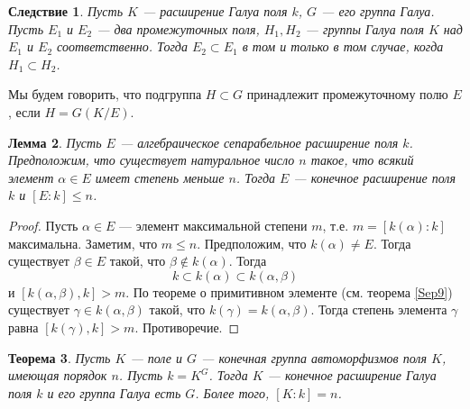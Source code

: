 \documentclass[12pt, titlepage, oneside]{amsbook}
\newtheorem{theorem}{Теорема}[chapter]
\newtheorem{lemma}[theorem]{Лемма}
\newtheorem{corollary}[theorem]{Следствие}
\theoremstyle{definition}
\theoremstyle{remark}
\begin{document}
\begin{corollary}
\label{Gal3}
Пусть $K$ --- расширение Галуа поля $k$, $G$ --- его группа Галуа. Пусть $E_1$ и $E_2$ --- два промежуточных поля, $H_1,H_2$ --- группы Галуа поля $K$ над $E_1$ и $E_2$ соответственно. Тогда $E_2\subset E_1$ в том и только в том случае, когда $H_1\subset H_2$.
\end{corollary}

Мы будем говорить, что подгруппа $H\subset G$ принадлежит промежуточному полю $E$, если $H=G(K/E)$.

\begin{lemma}
\label{GLem1}
Пусть $E$ --- алгебраическое сепарабельное расширение поля $k$. Предположим, что существует натуральное число $n$ такое, что всякий элемент $\alpha\in E$ имеет степень меньше $n$. Тогда $E$ --- конечное расширение поля $k$ и $[E:k]\leq n$.
\end{lemma}

\begin{proof}
Пусть $\alpha\in E$ --- элемент максимальной степени $m$, т.е. $m=[k(\alpha):k]$ максимальна. Заметим, что $m\leq n$. Предположим, что $k(\alpha)\neq E$. Тогда существует $\beta\in E$ такой, что $\beta\not\in k(\alpha)$. Тогда $$k\subset k(\alpha)\subset k(\alpha,\beta)$$ и $[k(\alpha,\beta),k]>m$. По теореме о примитивном элементе (см. теорема \ref{Sep9}) существует $\gamma\in k(\alpha,\beta)$ такой, что $k(\gamma)=k(\alpha,\beta)$. Тогда степень элемента $\gamma$ равна $[k(\gamma),k]>m$. Противоречие.
\end{proof}

\begin{theorem}
\label{Gal4}
Пусть $K$ --- поле и $G$ --- конечная группа автоморфизмов поля $K$, имеющая порядок $n$. Пусть $k=K^G$. Тогда $K$ --- конечное расширение Галуа поля $k$ и его группа Галуа есть $G$. Более того, $[K:k]=n$.
\end{theorem}
\end{document}
